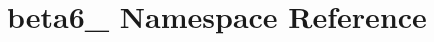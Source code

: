 \hypertarget{namespacebeta6__45}{}\section{beta6\+\_ Namespace Reference}
\label{namespacebeta6__45}

